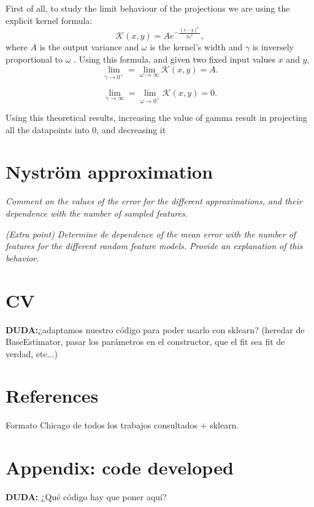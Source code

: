 \documentclass[11pt]{article}
\begin{document}
First of all, to study the limit behaviour of the projections we are using the explicit kernel formula:
\[
     \mathcal{K}(x, y) = Ae^{-\frac{\|x-y\|^{2}}{2 \omega^2}}, 
\] 
where \( A \) is the output variance and \( \omega \) is the kernel's width and \( \gamma \) is inversely proportional to \( \omega \) . Using this formula, and given two fixed input values \( x \) and \( y \),
\[
     \lim_{\gamma \to 0^{+}} = \lim_{\omega \to \infty} \mathcal{K}(x,y) = A.
\]

\[
     \lim_{\gamma \to \infty} = \lim_{\omega \to 0^{+}} \mathcal{K}(x,y) = 0.
\]

Using this theoretical results, increasing the value of gamma result in projecting all the datapoints into \( 0 \), and decreasing it 

\section*{Nyström approximation}

\emph{Comment on the values of the error for the different approximations, and their dependence with the number of sampled features.}

\emph{(Extra point) Determine de dependence of the mean error with the number of features for the different random feature models. Provide an explanation of this behavior.}


\section{CV}

\textbf{DUDA:}¿adaptamos nuestro código para poder usarlo con sklearn? (heredar de BaseEstimator, pasar los parámetros en el constructor, que el fit sea fit de verdad, etc...)

\section*{References}

Formato Chicago de todos los trabajos consultados + sklearn.

\section*{Appendix: code developed}

\textbf{DUDA:} ¿Qué código hay que poner aquí?
\end{document}

